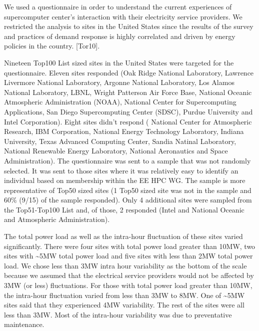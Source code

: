 We used a questionnaire in order to understand the current experiences of
supercomputer center's interaction with their electricity
service providers. We restricted the analysis to sites in the United States
since the results of the survey and practices of demand response is highly
correlated and driven by energy policies in the country. 
\cite{torriti_demand_2010}
[Tor10].

Nineteen Top100 List sized sites in the United States were targeted for the
questionnaire. Eleven sites responded (Oak Ridge National Laboratory, 
Lawrence Livermore National Laboratory, 
Argonne National Laboratory, 
Los Alamos National Laboratory, LBNL, 
Wright Patterson Air Force Base,
National Oceanic Atmospheric Administration (NOAA), 
National Center for Supercomputing Applications, 
San Diego Supercomputing Center (SDSC), 
Purdue University and Intel Corporation). Eight sites didn't respond (
National Center for Atmospheric Research,
IBM Corporation, 
National Energy Technology Laboratory, Indiana University, 
Texas Advanced Computing Center, 
Sandia Natinal Laboratory, 
National Renewable Energy Laboratory, 
National Aeronautics and Space Administration). The questionnaire was
sent to a sample that was not randomly selected. It was sent to those sites
where it was relatively easy to identify an individual based on membership
within the EE HPC WG. The sample is more representative of Top50 sized sites
(1 Top50 sized site was not in the sample and 60{\%} (9/15) of the sample
responded). Only 4 additional sites were sampled from the Top51-Top100 List
and, of those, 2 responded (Intel and National Oceanic and Atmospheric Administration).

The total power load as well as the intra-hour fluctuation of these sites
varied significantly. There were four sites with total power load greater
than 10MW, two sites with \textasciitilde 5MW total power load and five
sites with less than 2MW total power load. We chose less than 3MW intra hour
variability as the bottom of the scale because we assumed that the
electrical service providers would not be affected by 3MW (or less) 
fluctuations. For those with total power load greater than 10MW, the
intra-hour fluctuation varied from less than 3MW to 8MW. One of
\textasciitilde 5MW sites said that they experienced 4MW variability. The
rest of the sites were all less than 3MW. Most of the intra-hour variability
was due to preventative maintenance.



